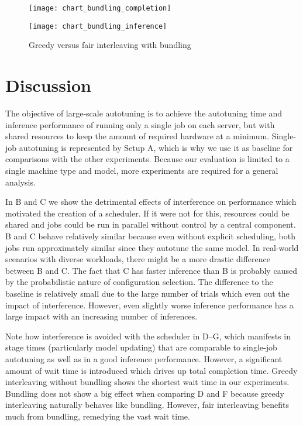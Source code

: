 \begin{figure}[t]
	\begin{minipage}[b]{.6\textwidth}
		\centering\texttt{[image: chart\_bundling\_completion]}
		\label{fig:chart-bundling-completion}
	\end{minipage}%
	\hfill
	\begin{minipage}[b]{.35\textwidth}
		\centering\texttt{[image: chart\_bundling\_inference]}
		\label{fig:chart-bundling-inference}
	\end{minipage}
	\caption[Results of greedy versus fair interleaving with bundling]{Greedy versus fair interleaving with bundling}
	\label{fig:chart-bundling}
\end{figure}

\section{Discussion}
The objective of large-scale autotuning is to achieve the autotuning time and inference performance of running only a single job on each server, but with shared resources to keep the amount of required hardware at a minimum. Single-job autotuning is represented by Setup A, which is why we use it as baseline for comparisons with the other experiments. Because our evaluation is limited to a single machine type and model, more experiments are required for a general analysis.

In B and C we show the detrimental effects of interference on performance which motivated the creation of a scheduler. If it were not for this, resources could be shared and jobs could be run in parallel without control by a central component. B and C behave relatively similar because even without explicit scheduling, both jobs run approximately similar since they autotune the same model. In real-world scenarios with diverse workloads, there might be a more drastic difference between B and C. The fact that C has faster inference than B is probably caused by the probabilistic nature of configuration selection. The difference to the baseline is relatively small due to the large number of trials which even out the impact of interference. However, even slightly worse inference performance has a large impact with an increasing number of inferences.

Note how interference is avoided with the scheduler in D--G, which manifests in stage times (particularly model updating) that are comparable to single-job autotuning as well as in a good inference performance. However, a significant amount of wait time is introduced which drives up total completion time. Greedy interleaving without bundling shows the shortest wait time in our experiments. Bundling does not show a big effect when comparing D and F because greedy interleaving naturally behaves like bundling. However, fair interleaving benefits much from bundling, remedying the vast wait time.

